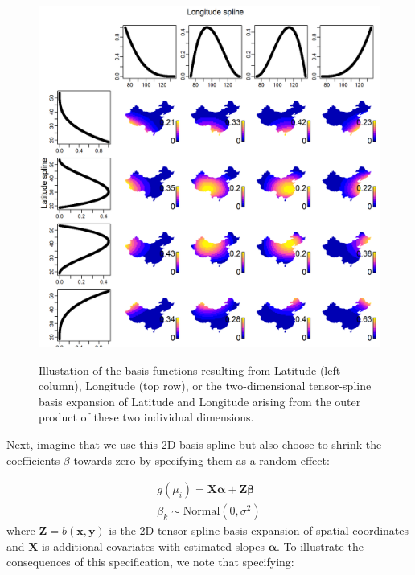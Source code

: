 \begin{figure}[!ht]
    \caption[Tensor product of cubic spline basis expansion for Latitude-Longitude]{Illustation of the basis functions resulting from Latitude (left column), Longitude (top row), or the two-dimensional tensor-spline basis expansion of Latitude and Longitude arising from the outer product of these two individual dimensions.}
    \centering
    \includegraphics[width=5.5in]{Chap_5/Basis-2D.png}
    \label{fig:Chap5_Basis_2D}
\end{figure}

Next, imagine that we use this 2D basis spline but also choose to shrink the coefficients \(\beta\) towards zero by specifying them as a random effect:

\begin{equation}
\begin{gathered} \label{eq:Chap5_variance}
    g(\mu_i) = \mathbf{X\alpha} + \mathbf{Z\beta} \\
    \beta_k \sim \mathrm{Normal}(0,\sigma^2)
\end{gathered}
\end{equation}
where \( \mathbf{Z} = b(\mathbf{x}, \mathbf{y}) \) is the 2D tensor-spline basis expansion of spatial coordinates and \(\mathbf{X}\) is additional covariates with estimated slopes \(\mathbf{\alpha}\).  To illustrate the consequences of this specification, we note that specifying:

